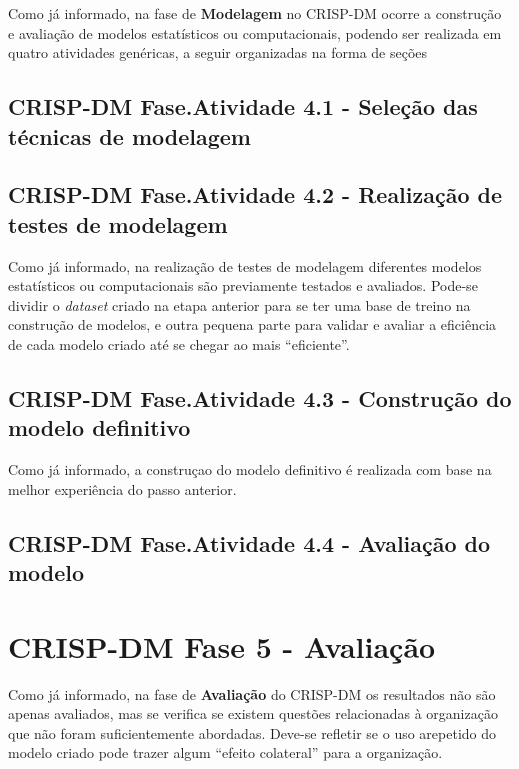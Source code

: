 \documentclass[]{article}
\begin{document}
Como já informado, na fase de \textbf{Modelagem} no CRISP-DM ocorre a
construção e avaliação de modelos estatísticos ou computacionais,
podendo ser realizada em quatro atividades genéricas, a seguir
organizadas na forma de seções

\subsection{CRISP-DM Fase.Atividade 4.1 - Seleção das técnicas de
modelagem}\label{crisp-dm-fase.atividade-4.1---selecao-das-tecnicas-de-modelagem}

\subsection{CRISP-DM Fase.Atividade 4.2 - Realização de testes de
modelagem}\label{crisp-dm-fase.atividade-4.2---realizacao-de-testes-de-modelagem}

Como já informado, na realização de testes de modelagem diferentes
modelos estatísticos ou computacionais são previamente testados e
avaliados. Pode-se dividir o \emph{dataset} criado na etapa anterior
para se ter uma base de treino na construção de modelos, e outra pequena
parte para validar e avaliar a eficiência de cada modelo criado até se
chegar ao mais ``eficiente''.

\subsection{CRISP-DM Fase.Atividade 4.3 - Construção do modelo
definitivo}\label{crisp-dm-fase.atividade-4.3---construcao-do-modelo-definitivo}

Como já informado, a construçao do modelo definitivo é realizada com
base na melhor experiência do passo anterior.

\subsection{CRISP-DM Fase.Atividade 4.4 - Avaliação do
modelo}\label{crisp-dm-fase.atividade-4.4---avaliacao-do-modelo}

\section{\texorpdfstring{CRISP-DM Fase 5 -
\textbf{Avaliação}}{CRISP-DM Fase 5 - Avaliação}}\label{crisp-dm-fase-5---avaliacao}

Como já informado, na fase de \textbf{Avaliação} do CRISP-DM os
resultados não são apenas avaliados, mas se verifica se existem questões
relacionadas à organização que não foram suficientemente abordadas.
Deve-se refletir se o uso arepetido do modelo criado pode trazer algum
``efeito colateral'' para a organização.
\end{document}
